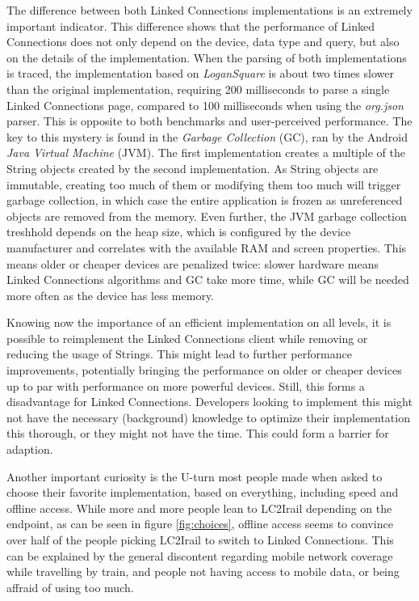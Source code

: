 \documentclass[twocolumn]{phdsymp} %
\begin{document}
The difference between both Linked Connections implementations is an extremely important indicator. This difference shows that the performance of Linked Connections does not only depend on the device, data type and query, but also on the details of the implementation. When the parsing of both implementations is traced, the implementation based on \emph{LoganSquare} is about two times slower than the original implementation, requiring 200 milliseconds to parse a single Linked Connections page, compared to 100 milliseconds when using the \emph{org.json} parser. This is opposite to both benchmarks and user-perceived performance. The key to this mystery is found in the \emph{Garbage Collection} (GC), ran by the Android \emph{Java Virtual Machine} (JVM). The first implementation creates a multiple of the String objects created by the second implementation. As String objects are immutable, creating too much of them or modifying them too much will trigger garbage collection, in which case the entire application is frozen as unreferenced objects are removed from the memory. Even further, the JVM garbage collection treshhold depends on the heap size, which is configured by the device manufacturer and correlates with the available RAM and screen properties. This means older or cheaper devices are penalized twice: slower hardware means Linked Connections algorithms and GC take more time, while GC will be needed more often as the device has less memory.

Knowing now the importance of an efficient implementation on all levels, it is possible to reimplement the Linked Connections client while removing or reducing the usage of Strings. This might lead to further performance improvements, potentially bringing the performance on older or cheaper devices up to par with performance on more powerful devices. Still, this forms a disadvantage for Linked Connections. Developers looking to implement this might not have the necessary (background) knowledge to optimize their implementation this thorough, or they might not have the time. This could form a barrier for adaption. 

Another important curiosity is the U-turn most people made when asked to choose their favorite implementation, based on everything, including speed and offline access. While more and more people lean to LC2Irail depending on the endpoint, as can be seen in figure \ref{fig:choices}, offline access seems to convince over half of the people picking LC2Irail to switch to Linked Connections. This can be explained by the general discontent regarding mobile network coverage while travelling by train, and people not having access to mobile data, or being affraid of using too much.
\end{document}
